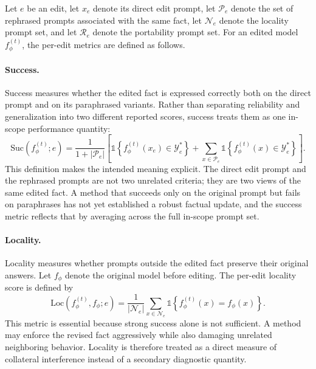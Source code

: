 Let $e$ be an edit, let $x_e$ denote its direct edit prompt, let $\mathcal{P}_e$ denote the set of rephrased prompts associated with the same fact, let $\mathcal{N}_e$ denote the locality prompt set, and let $\mathcal{R}_e$ denote the portability prompt set. For an edited model $f_{\phi}^{(t)}$, the per-edit metrics are defined as follows.

\paragraph{Success.} Success measures whether the edited fact is expressed correctly both on the direct prompt and on its paraphrased variants. Rather than separating reliability and generalization into two different reported scores, success treats them as one in-scope performance quantity:
\begin{equation}
\mathrm{Suc}(f_{\phi}^{(t)}; e)
= \frac{1}{1 + |\mathcal{P}_e|}
\left[
\mathds{1}\left\{ f_{\phi}^{(t)}(x_e) \in \mathcal{Y}_e^* \right\}
+
\sum_{x \in \mathcal{P}_e}
\mathds{1}\left\{ f_{\phi}^{(t)}(x) \in \mathcal{Y}_e^* \right\}
\right].
\end{equation}
This definition makes the intended meaning explicit. The direct edit prompt and the rephrased prompts are not two unrelated criteria; they are two views of the same edited fact. A method that succeeds only on the original prompt but fails on paraphrases has not yet established a robust factual update, and the success metric reflects that by averaging across the full in-scope prompt set.

\paragraph{Locality.} Locality measures whether prompts outside the edited fact preserve their original answers. Let $f_{\phi}$ denote the original model before editing. The per-edit locality score is defined by
\begin{equation}
\mathrm{Loc}(f_{\phi}^{(t)}, f_{\phi}; e)
= \frac{1}{|\mathcal{N}_e|}
\sum_{x \in \mathcal{N}_e}
\mathds{1}\left\{ f_{\phi}^{(t)}(x) = f_{\phi}(x) \right\}.
\end{equation}
This metric is essential because strong success alone is not sufficient. A method may enforce the revised fact aggressively while also damaging unrelated neighboring behavior. Locality is therefore treated as a direct measure of collateral interference instead of a secondary diagnostic quantity.

